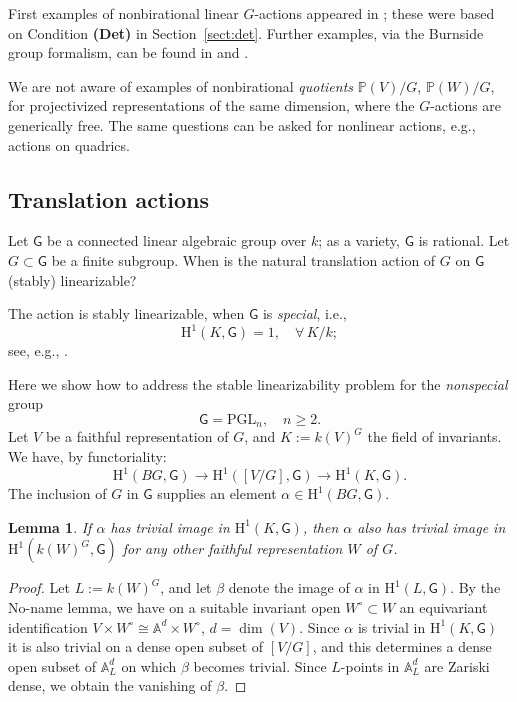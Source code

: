 \documentclass[12pt,reqno]{amsart}
\theoremstyle{plain}
\newtheorem{lemm}[prop]{Lemma}
\theoremstyle{remark}
\theoremstyle{definition}
\numberwithin{equation}{section}
\newcommand{\A}{{\mathbb A}}
\newcommand{\bP}{{\mathbb P}}
\newcommand{\rH}{{\mathrm H}}
\newcommand{\PGL}{{\mathrm{PGL}}}
\begin{document}
First examples of nonbirational linear $G$-actions appeared in \cite{RYinvariant}; these were based on 
Condition {\bf (Det)} in Section~\ref{sect:det}. Further examples, via the Burnside group formalism, can be found 
in \cite{CTZ-p2}   and \cite{tschinkelyangzhang}.

We are not aware of examples of 
nonbirational {\em quotients} $\bP(V)/G$, $\bP(W)/G$, for projectivized representations of the same dimension, where the $G$-actions are generically free.
The same questions can be asked for nonlinear actions, e.g., actions on quadrics. 

\subsection*{Translation actions}

Let $\mathsf G$ be a connected linear algebraic group over $k$; as a variety, $\mathsf G$ is rational. Let $G\subset \mathsf G$ be a finite subgroup. 
When is the natural translation action of $G$ on $\mathsf G$ (stably) linearizable?

The action is stably linearizable, when $\mathsf G$ is {\em special}, i.e., 
$$
\rH^1(K,\mathsf G)=1,\quad \forall\, K/k; 
$$
see, e.g., \cite[Prop. 4.1]{HT-quad}. 

Here we show how to address the stable linearizability problem for the {\em nonspecial} group $$
\mathsf G=\PGL_{n}, \quad n\ge 2.
$$
Let $V$ be a faithful representation of $G$,
and $K:=k(V)^G$ the field of invariants.
We have, by functoriality:
\begin{equation}
\label{eqn.toH1KsfG}
\rH^1(BG,\mathsf G) \to \rH^1([V/G], \mathsf G)\to \rH^1(K,\mathsf G).
\end{equation}
The inclusion of $G$ in $\mathsf G$ supplies an element $\alpha\in \rH^1(BG,\mathsf G)$.

\begin{lemm}
\label{lem.indepV}
If $\alpha$ has trivial image in $\rH^1(K,\mathsf G)$, then $\alpha$ also has trivial image in $\rH^1(k(W)^G,\mathsf G)$ for any other faithful representation $W$ of $G$.
\end{lemm}

\begin{proof}
Let $L:=k(W)^G$, and let $\beta$ denote the
image of $\alpha$ in $\rH^1(L,\mathsf G)$.
By the No-name lemma, we have on a suitable invariant open $W^\circ\subset W$ an equivariant identification $V\times W^\circ\cong \A^d\times W^\circ$, $d=\dim(V)$.
Since $\alpha$ is trivial in $\rH^1(K,\mathsf G)$ it is also trivial on a dense open subset of $[V/G]$, and this determines a dense open subset of $\A^d_L$ on which $\beta$ becomes trivial.
Since $L$-points in $\A^d_L$ are Zariski dense, we obtain the vanishing of $\beta$.
\end{proof}
\end{document}
